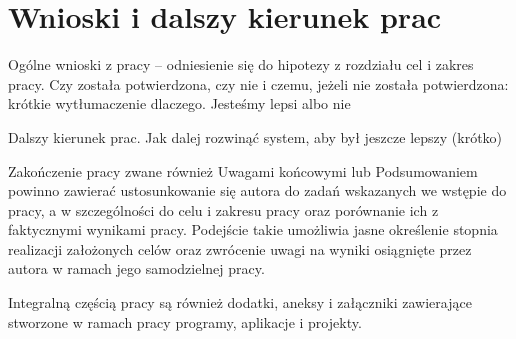 
\chapter{Wnioski i dalszy kierunek prac} %

Ogólne wnioski z pracy – odniesienie się do hipotezy z rozdziału cel i zakres pracy. Czy została potwierdzona, czy nie i czemu, jeżeli nie została potwierdzona: krótkie wytłumaczenie dlaczego. Jesteśmy lepsi albo nie

Dalszy kierunek prac. Jak dalej rozwinąć system, aby był jeszcze lepszy (krótko)

Zakończenie pracy zwane również Uwagami końcowymi lub Podsumowaniem powinno zawierać ustosunkowanie
się autora do zadań wskazanych we wstępie do pracy, a w szczególności do celu i zakresu pracy oraz
porównanie ich z faktycznymi wynikami pracy. Podejście takie umożliwia jasne określenie stopnia
realizacji założonych celów oraz zwrócenie uwagi na wyniki osiągnięte przez autora w ramach jego
samodzielnej pracy.

Integralną częścią pracy są również dodatki, aneksy i załączniki zawierające stworzone w ramach pracy programy, aplikacje i projekty.

